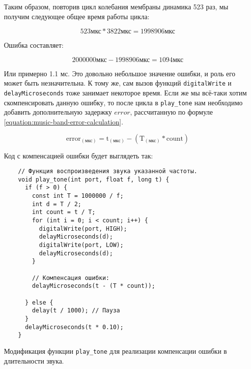 \documentclass[../sparc.tex]{subfiles}
\begin{document}
Таким образом, повторив цикл колебания мембраны динамика 523 раз, мы получим
следующее общее время работы цикла:

\begin{equation}
  523 \mbox{мкс} * 3822 \mbox{мкс} = 1998906 \mbox{мкс}
\end{equation}

Ошибка составляет:

\begin{equation}
  2000000 \mbox{мкс} - 1998906 \mbox{мкс} = 1094 \mbox{мкс}
\end{equation}

Или примерно 1.1 мс.  Это довольно небольшое значение ошибки, и роль его может
быть незначительна.  К тому же, сам вызов функций \texttt{digitalWrite} и
\texttt{delayMicroseconds} тоже занимает некоторое время.  Если же мы всё-таки
хотим скомпенсировать данную ошибку, то после цикла в \texttt{play\_tone} нам
необходимо добавить дополнительную задержку $error$, рассчитанную по формуле
\ref{equation:music-band-error-calculation}.

\begin{equation}
  \mbox{error}_{(\mbox{мкс})} = \mbox{t}_{(\mbox{мкс})} -
  (\mbox{T}_{(\mbox{мкс})} * \mbox{count})
  \label{equation:music-band-error-calculation}
\end{equation}

Код с компенсацией ошибки будет выглядеть так:

\begin{listing}[!h]
  \begin{verbatim}
    // Функция воспроизведения звука указанной частоты.
    void play_tone(int port, float f, long t) {
      if (f > 0) {
        const int T = 1000000 / f;
        int d = T / 2;
        int count = t / T;
        for (int i = 0; i < count; i++) {
          digitalWrite(port, HIGH);
          delayMicroseconds(d);
          digitalWrite(port, LOW);
          delayMicroseconds(d);
        }

        // Компенсация ошибки:
        delayMicroseconds(t - (T * count));

      } else {
        delay(t / 1000); // Пауза
      }
      delayMicroseconds(t * 0.10);
    }
  \end{verbatim}
  \label{listing:music-band-play-tone-with-error-compensation}
  \caption{Модификация функции \texttt{play\_tone} для реализации компенсации
    ошибки в длительности звука.}
\end{listing}
\end{document}
